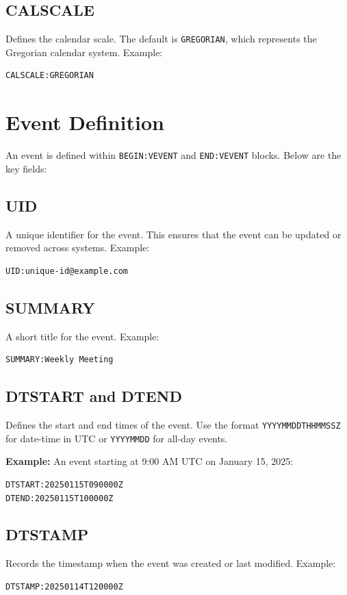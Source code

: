 \documentclass[a4paper,12pt]{article}
\begin{document}
\subsection{CALSCALE}
Defines the calendar scale. The default is \texttt{GREGORIAN}, which represents the Gregorian calendar system. Example:
\begin{verbatim}
CALSCALE:GREGORIAN
\end{verbatim}

\section{Event Definition}
An event is defined within \texttt{BEGIN:VEVENT} and \texttt{END:VEVENT} blocks. Below are the key fields:

\subsection{UID}
A unique identifier for the event. This ensures that the event can be updated or removed across systems. Example:
\begin{verbatim}
UID:unique-id@example.com
\end{verbatim}

\subsection{SUMMARY}
A short title for the event. Example:
\begin{verbatim}
SUMMARY:Weekly Meeting
\end{verbatim}

\subsection{DTSTART and DTEND}
Defines the start and end times of the event. Use the format \texttt{YYYYMMDDTHHMMSSZ} for date-time in UTC or \texttt{YYYYMMDD} for all-day events.

\textbf{Example:} An event starting at 9:00 AM UTC on January 15, 2025:
\begin{verbatim}
DTSTART:20250115T090000Z
DTEND:20250115T100000Z
\end{verbatim}

\subsection{DTSTAMP}
Records the timestamp when the event was created or last modified. Example:
\begin{verbatim}
DTSTAMP:20250114T120000Z
\end{verbatim}
\end{document}
